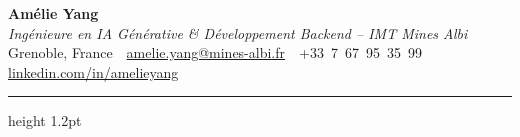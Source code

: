 \documentclass[10.5pt,a4paper]{article}
\begin{document}
\begin{center}
  {\fontsize{26}{30}\selectfont\bfseries Amélie Yang}\\[4pt]
  {\color{accent}\itshape\large Ingénieure en IA Générative \& Développement Backend -- IMT Mines Albi}\\[6pt]
  {\small
    Grenoble, France
    \,\textbullet\,
    \href{mailto:amelie.yang@mines-albi.fr}{amelie.yang@mines-albi.fr}
    \,\textbullet\,
    +33~7~67~95~35~99
    \,\textbullet\,
    \href{https://www.linkedin.com/in/amelieyang}{linkedin.com/in/amelieyang}
  }
\end{center}

\vspace{3pt}
{\color{accent}\hrule height 1.2pt}
\vspace{4pt}
\end{document}
